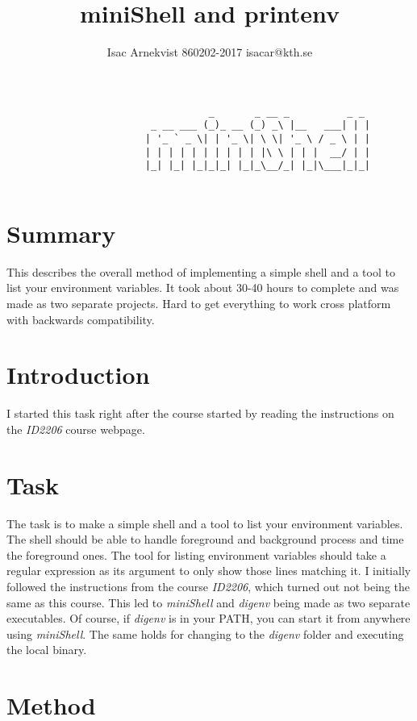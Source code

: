 \documentclass{article}
\author{Isac Arnekvist 860202-2017 isacar@kth.se}
\title{miniShell and printenv}
\begin{document}
\maketitle
\begin{verbatim}
                                   _       _ __ _          _ _ 
                         _ __ ___ (_)_ __ (_) _\ |__   ___| | |
                        | '_ ` _ \| | '_ \| \ \| '_ \ / _ \ | |
                        | | | | | | | | | | |\ \ | | |  __/ | |
                        |_| |_| |_|_|_| |_|_\__/_| |_|\___|_|_|
                                                               
\end{verbatim}
\section*{Summary}
    This describes the overall method of implementing a simple shell and a tool
    to list your environment variables. It took about 30-40 hours to complete
    and was made as two separate projects.  Hard to get everything to work
    cross platform with backwards compatibility.

\newpage
{}
\section{Introduction}
    I started this task right after the course started by reading the instructions
    on the \emph{ID2206} course webpage.
    
\section{Task}
    The task is to make a simple shell and a tool to list your environment
    variables. The shell should be able to handle foreground and background
    process and time the foreground ones. The tool for listing environment
    variables should take a regular expression as its argument to only show
    those lines matching it.  I initially followed the instructions from the
    course \emph{ID2206}, which turned out not being the same as this course.
    This led to \emph{miniShell} and \emph{digenv} being made as two separate
    executables. Of course, if \emph{digenv} is in your PATH, you can start it
    from anywhere using \emph{miniShell}. The same holds for changing to the
    \emph{digenv} folder and executing the local binary.

\section{Method}
\end{document}
